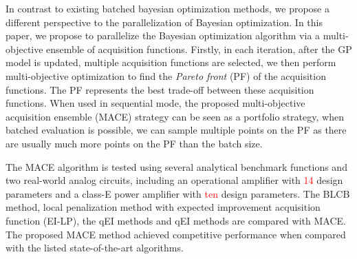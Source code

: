 In contrast to existing batched bayesian optimization methods, we propose a
different perspective to the parallelization of Bayesian optimization. In this
paper, we propose to parallelize the Bayesian optimization algorithm via a
multi-objective ensemble of acquisition functions. Firstly, in each iteration,
after the GP model is updated, multiple acquisition functions are selected, we
then perform multi-objective optimization to find the \emph{Pareto front} (PF)
of the acquisition functions. The PF represents the best trade-off between
these acquisition functions. When used in sequential mode, the proposed
multi-objective acquisition ensemble (MACE) strategy can be seen as a portfolio
strategy, when batched evaluation is possible, we can sample multiple points on
the PF as there are usually much more points on the PF than the batch size.

The MACE algorithm is tested using several analytical benchmark functions and
two real-world analog circuits, including an operational amplifier with
\textcolor{red}{14} design parameters and a class-E power amplifier with
\textcolor{red}{ten} design parameters. The BLCB method, local penalization
method with expected improvement acquisition function (EI-LP), the qEI methods
and qEI methods are compared with MACE. The proposed MACE method achieved
competitive performance when compared with the listed state-of-the-art
algorithms.
